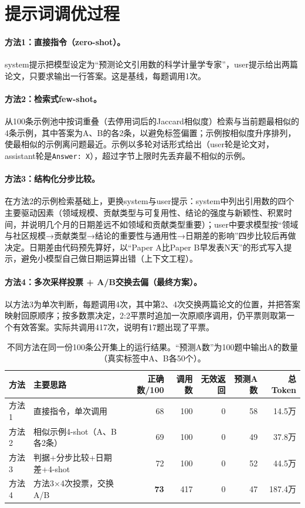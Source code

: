 \documentclass{article}
\begin{document}
\section{提示词调优过程}
\paragraph{方法1：直接指令（zero-shot）。}system提示把模型设定为“预测论文引用数的科学计量学专家”，user提示给出两篇论文，只要求输出一行答案。这是基线，每题调用1次。

\paragraph{方法2：检索式few-shot。}从100条示例池中按词重叠（去停用词后的Jaccard相似度）检索与当前题最相似的4条示例，其中答案为A、B的各2条，以避免标签偏置；示例按相似度升序排列，使最相似的示例离问题最近。示例以多轮对话形式给出（user轮是论文对，assistant轮是\texttt{Answer: X}），超过字节上限时先丢弃最不相似的示例。

\paragraph{方法3：结构化分步比较。}在方法2的示例检索基础上，更换system与user提示：system中列出引用数的四个主要驱动因素（领域规模、贡献类型与可复用性、结论的强度与新颖性、积累时间，并说明几个月的日期差远不如领域和贡献类型重要）；user中要求模型按“领域与社区规模→贡献类型→结论的重要性与通用性→日期差的影响”四步比较后再做决定。日期差由代码预先算好，以“Paper A比Paper B早发表N天”的形式写入提示，避免小模型自己做日期运算出错（上下文工程）。

\paragraph{方法4：多次采样投票 + A/B交换去偏（最终方案）。}以方法3为单次判断，每题调用4次，其中第2、4次交换两篇论文的位置，并把答案映射回原顺序；按多数票决定，2:2平票时追加一次原顺序调用，仍平票则取第一个有效答案。实际共调用417次，说明有17题出现了平票。

\begin{table}[h]
\centering
\caption{不同方法在同一份100条公开集上的运行结果。“预测A数”为100题中输出A的数量（真实标签中A、B各50个）。}
\label{tab:main}
\small
\begin{tabularx}{\linewidth}{lXrrrrr}
\toprule
方法 & 主要思路 & 正确数/100 & 调用数 & 无效返回 & 预测A数 & 总Token\\
\midrule
方法1 & 直接指令，单次调用 & 68 & 100 & 0 & 58 & 14.5万\\
方法2 & 相似示例4-shot（A、B各2条） & 69 & 100 & 0 & 49 & 37.8万\\
方法3 & 判据+分步比较+日期差+4-shot & 72 & 100 & 0 & 52 & 44.5万\\
方法4 & 方法3×4次投票，交换A/B & \textbf{73} & 417 & 0 & 47 & 187.4万\\
\bottomrule
\end{tabularx}
\end{table}
\end{document}
